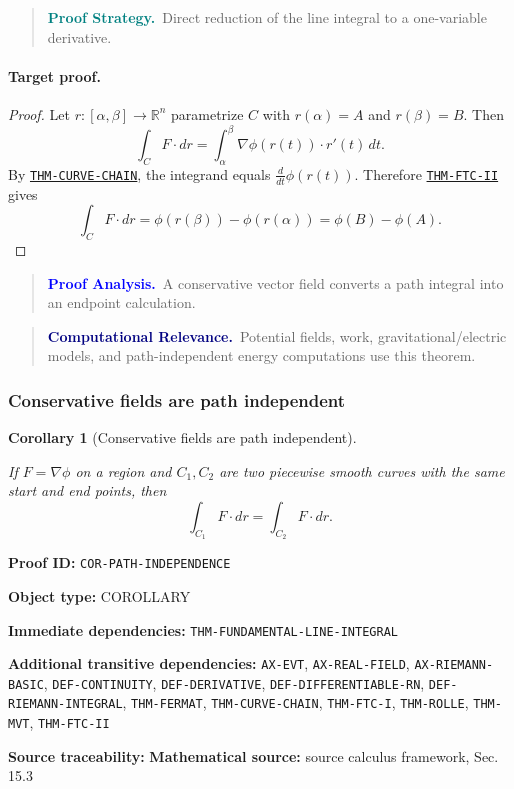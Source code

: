 \documentclass[10pt]{article}
\newcommand{\pidraw}[1]{\begingroup\urlstyle{tt}\nolinkurl{#1}\endgroup}
\newcommand{\pidref}[1]{\hyperref[prf:#1]{\pidraw{#1}}}
\newcommand{\pid}[1]{\pidref{#1}}
\newtheorem{corollary}[theorem]{Corollary}
\theoremstyle{definition}
\theoremstyle{remark}
\newenvironment{proofstrategy}
{\begin{quote}\small\noindent\textbf{\textcolor{teal}{Proof Strategy.}}\ }
{\end{quote}}
\newenvironment{proofanalysis}
{\begin{quote}\small\noindent\textbf{\textcolor{blue}{Proof Analysis.}}\ }
{\end{quote}}
\newenvironment{computationalrelevance}
{\begin{quote}\small\noindent\textbf{\textcolor{navy}{Computational Relevance.}}\ }
{\end{quote}}
\newcommand{\meta}[2]{\noindent\textbf{#1:} #2\par}
\begin{document}
\begin{proofstrategy}Direct reduction of the line integral to a one-variable derivative.\end{proofstrategy}

\paragraph{Target proof.}

\begin{proof}

Let $r:[\alpha,\beta]\to\mathbb{R}^n$ parametrize $C$ with
$r(\alpha)=A$ and $r(\beta)=B$. Then
\[
\int_C F\cdot dr
=
\int_\alpha^\beta \nabla\phi(r(t))\cdot r'(t)\,dt.
\]
By \pid{THM-CURVE-CHAIN}, the integrand equals
$\frac{d}{dt}\phi(r(t))$. Therefore \pid{THM-FTC-II} gives
\[
\int_C F\cdot dr
=
\phi(r(\beta))-\phi(r(\alpha))
=
\phi(B)-\phi(A).
\]

\end{proof}

\begin{proofanalysis}A conservative vector field converts a path integral into an endpoint calculation.\end{proofanalysis}

\begin{computationalrelevance}Potential fields, work, gravitational/electric models, and path-independent energy computations use this theorem.\end{computationalrelevance}

\subsubsection{Conservative fields are path independent}

\begin{corollary}[Conservative fields are path independent]\label{prf:COR-PATH-INDEPENDENCE}

If $F=\nabla\phi$ on a region and $C_1,C_2$ are two piecewise smooth curves with the same start and end points, then
\[
\int_{C_1}F\cdot dr=\int_{C_2}F\cdot dr.
\]

\end{corollary}

\meta{Proof ID}{\pidraw{COR-PATH-INDEPENDENCE}}
\meta{Object type}{COROLLARY}
\meta{Immediate dependencies}{\pidraw{THM-FUNDAMENTAL-LINE-INTEGRAL}}
\meta{Additional transitive dependencies}{\pidraw{AX-EVT}, \pidraw{AX-REAL-FIELD}, \pidraw{AX-RIEMANN-BASIC}, \pidraw{DEF-CONTINUITY}, \pidraw{DEF-DERIVATIVE}, \pidraw{DEF-DIFFERENTIABLE-RN}, \pidraw{DEF-RIEMANN-INTEGRAL}, \pidraw{THM-FERMAT}, \pidraw{THM-CURVE-CHAIN}, \pidraw{THM-FTC-I}, \pidraw{THM-ROLLE}, \pidraw{THM-MVT}, \pidraw{THM-FTC-II}}
\meta{Source traceability}{\textbf{Mathematical source:} source calculus framework, Sec. 15.3}
\end{document}
